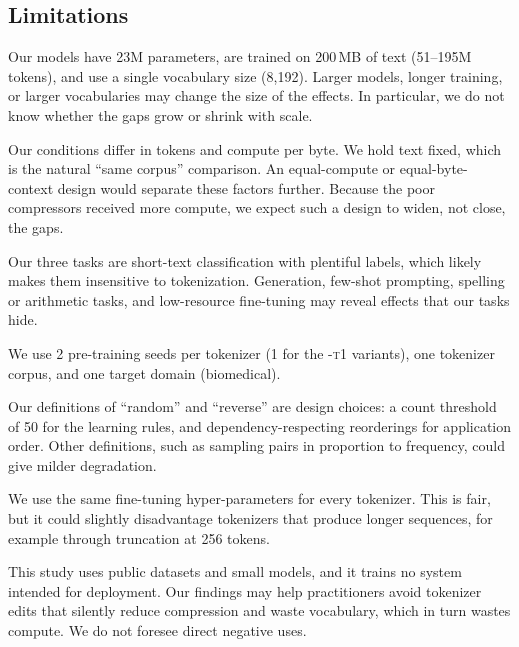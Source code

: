 \subsection{Limitations}
\label{sec:limitations}

Our models have 23M parameters, are trained on 200\,MB of text (51--195M tokens), and use a single vocabulary size (8,192).
Larger models, longer training, or larger vocabularies may change the size of the effects.
In particular, we do not know whether the \bpb gaps grow or shrink with scale.

Our conditions differ in tokens and compute per byte.
We hold text fixed, which is the natural ``same corpus'' comparison.
An equal-compute or equal-byte-context design would separate these factors further.
Because the poor compressors received more compute, we expect such a design to widen, not close, the \bpb gaps.

Our three tasks are short-text classification with plentiful labels, which likely makes them insensitive to tokenization.
Generation, few-shot prompting, spelling or arithmetic tasks, and low-resource fine-tuning may reveal effects that our tasks hide.

We use 2 pre-training seeds per tokenizer (1 for the \textsc{-t1} variants), one tokenizer corpus, and one target domain (biomedical).

Our definitions of ``random'' and ``reverse'' are design choices: a count threshold of 50 for the learning rules, and dependency-respecting reorderings for application order.
Other definitions, such as sampling pairs in proportion to frequency, could give milder degradation.

We use the same fine-tuning hyper-parameters for every tokenizer.
This is fair, but it could slightly disadvantage tokenizers that produce longer sequences, for example through truncation at 256 tokens.

This study uses public datasets and small models, and it trains no system intended for deployment.
Our findings may help practitioners avoid tokenizer edits that silently reduce compression and waste vocabulary, which in turn wastes compute.
We do not foresee direct negative uses.
